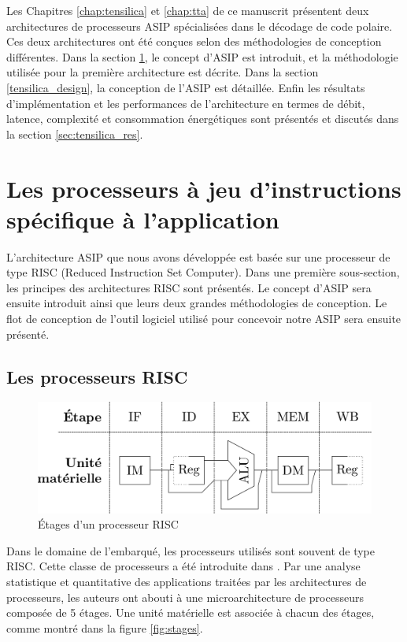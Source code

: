 Les Chapitres \ref{chap:tensilica} et \ref{chap:tta} de ce manuscrit présentent deux architectures de processeurs ASIP spécialisées dans le décodage de code polaire. Ces deux architectures ont été conçues selon des méthodologies de conception différentes. Dans la section \ref{sec:asips}, le concept d'ASIP est introduit, et la méthodologie utilisée pour la première architecture est décrite. Dans la section \ref{tensilica_design}, la conception de l'ASIP est détaillée. Enfin les résultats d'implémentation et les performances de l'architecture en termes de débit, latence, complexité et consommation énergétiques sont présentés et discutés dans la section \ref{sec:tensilica_res}.


\section{Les processeurs à jeu d'instructions spécifique à l'application}
\label{sec:asips}

L'architecture ASIP que nous avons développée est basée sur une processeur de type RISC (Reduced Instruction Set Computer). Dans une première sous-section, les principes des architectures RISC sont présentés. Le concept d'ASIP sera ensuite introduit ainsi que leurs deux grandes méthodologies de conception. Le flot de conception de l'outil logiciel utilisé pour concevoir notre ASIP sera ensuite présenté.

\subsection{Les processeurs RISC}
\label{subsec:risc}
\begin{figure}[t]
\centering
\includegraphics[width=\textwidth]{main/ch3_fig/stages}
\caption{\'Etages d'un processeur RISC}
\label{fig:risc}
\end{figure}

Dans le domaine de l'embarqué, les processeurs utilisés sont souvent de type RISC. Cette classe de processeurs a été introduite dans \cite{hennessy2011computer}. Par une analyse statistique et quantitative des applications traitées par les architectures de processeurs, les auteurs ont abouti à une microarchitecture de processeurs composée de 5 étages. Une unité matérielle est associée à chacun des étages, comme montré dans la figure \ref{fig:stages}.


